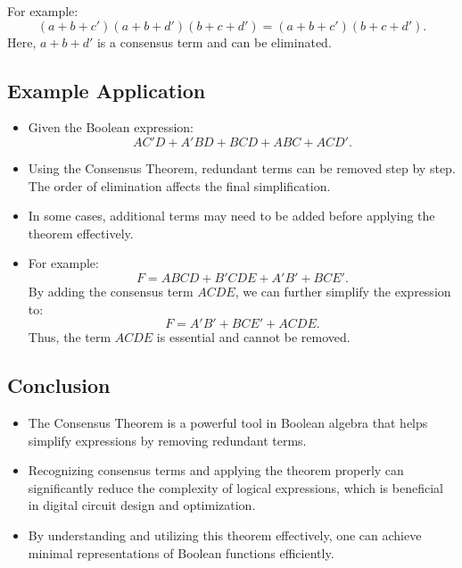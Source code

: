 For example:
\[
(a + b + c')(a + b + d')(b + c + d') = (a + b + c')(b + c + d').
\]
Here, \( a + b + d' \) is a consensus term and can be eliminated.

\subsection{Example Application}
\begin{itemize}
\item Given the Boolean expression:
\[
AC'D + A'BD + BCD + ABC + ACD'.
\]

\item Using the Consensus Theorem, redundant terms can be removed step by step. The order of elimination affects the final simplification.

\item In some cases, additional terms may need to be added before applying the theorem effectively. 
\item For example:
\[
F = ABCD + B'CDE + A'B' + BCE'.
\]
By adding the consensus term \( ACDE \), we can further simplify the expression to:
\[
F = A'B' + BCE' + ACDE.
\]
Thus, the term \( ACDE \) is essential and cannot be removed.
\end{itemize}

\subsection{Conclusion}
\begin{itemize}
\item The Consensus Theorem is a powerful tool in Boolean algebra that helps simplify expressions by removing redundant terms. 
\item Recognizing consensus terms and applying the theorem properly can significantly reduce the complexity of logical expressions, which is beneficial in digital circuit design and optimization. 
\item By understanding and utilizing this theorem effectively, one can achieve minimal representations of Boolean functions efficiently.
\end{itemize}
